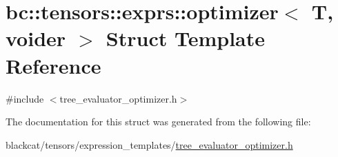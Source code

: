 \hypertarget{structbc_1_1tensors_1_1exprs_1_1optimizer}{}\section{bc\+:\+:tensors\+:\+:exprs\+:\+:optimizer$<$ T, voider $>$ Struct Template Reference}
\label{structbc_1_1tensors_1_1exprs_1_1optimizer}


{\ttfamily \#include $<$tree\+\_\+evaluator\+\_\+optimizer.\+h$>$}



The documentation for this struct was generated from the following file\+:\begin{DoxyCompactItemize}
\item 
blackcat/tensors/expression\+\_\+templates/\hyperlink{tree__evaluator__optimizer_8h}{tree\+\_\+evaluator\+\_\+optimizer.\+h}\end{DoxyCompactItemize}
